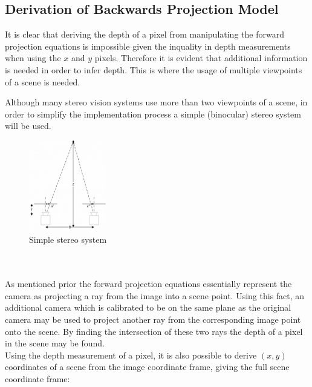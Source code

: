 \documentclass[11pt]{scrartcl}
\begin{document}
\subsection{Derivation of Backwards Projection Model}
It is clear that deriving the depth of a pixel from manipulating the forward
projection equations is impossible given the inquality in depth measurements
when using the $x$ and $y$ pixels. Therefore it is evident that additional
information is needed in order to infer depth. This is where the usage of
multiple viewpoints of a scene is needed.

\begin{remark}
  Although many stereo vision systems use more than two viewpoints of a scene,
  in order to simplify the implementation process a simple (binocular) stereo
  system will be used.
\end{remark}
\begin{figure}
  \centering
  \includegraphics[width=0.3\textwidth]{img2.resized.png}
  \caption{\label{fig:frog2}Simple stereo system}
\end{figure}
\\
\\

As mentioned prior the forward projection equations essentially represent the camera
as projecting a ray from the image into a scene point. Using this fact, an
additional camera which is calibrated to be on the same plane as the original camera
may be used to project another ray from the corresponding image point onto the scene. By
finding the intersection of these two rays the depth of a pixel in the scene may be found. 
\\
Using the depth measurement of a pixel, it is also possible to derive
$(x, y)$ coordinates of a scene from the image coordinate frame, giving
the full scene coordinate frame:
\end{document}
